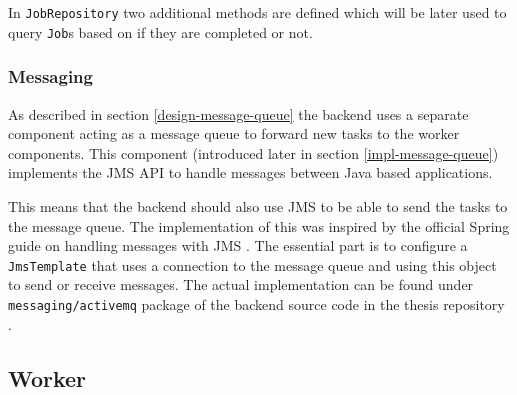 In \texttt{JobRepository} two additional methods are defined which will be later used to query \texttt{Job}s based on if they are completed or not.

\subsubsection{Messaging}


As described in section \ref{design-message-queue} the backend uses a separate component acting as a message queue to forward new tasks to the worker components. This component (introduced later in section \ref{impl-message-queue}) implements the JMS API \cite{JMS} to handle messages between Java based applications.

This means that the backend should also use JMS to be able to send the tasks to the message queue. The implementation of this was inspired by the official Spring guide on handling messages with JMS \cite{JMSGuide}. The essential part is to configure a \texttt{JmsTemplate} that uses a connection to the message queue and using this object to send or receive messages. The actual implementation can be found under \texttt{messaging/activemq} package of the backend source code in the thesis repository \cite{ThesisRepo}.

\subsection{Worker}




